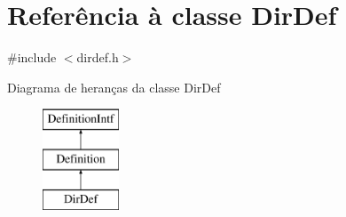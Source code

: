 \hypertarget{class_dir_def}{\section{Referência à classe Dir\-Def}
\label{class_dir_def}
}


{\ttfamily \#include $<$dirdef.\-h$>$}

Diagrama de heranças da classe Dir\-Def\begin{figure}[H]
\begin{center}
\leavevmode
\includegraphics[height=3.000000cm]{class_dir_def}
\end{center}
\end{figure}
